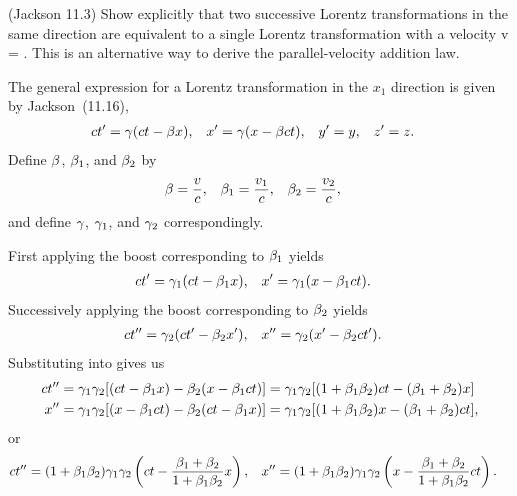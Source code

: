 \newcommand{\vq}{v_1}
\newcommand{\vw}{v_2}

\begin{statement}{(Jackson 11.3)}
	Show explicitly that two successive Lorentz transformations in the same direction are equivalent to a single Lorentz transformation with a velocity
	\beq
		v = \frac{\vq + \vw}{1 + \vq \vw / c^2}.
	\eeq
	This is an alternative way to derive the parallel-velocity addition law.
\end{statement}

\newcommand{\xo}{x_0}
\newcommand{\xq}{x_1}
\newcommand{\xw}{x_2}
\newcommand{\xe}{x_3}

\newcommand{\betq}{\bet_1}
\newcommand{\betw}{\bet_2}
\newcommand{\gamq}{\gam_1}
\newcommand{\gamw}{\gam_2}

\begin{solution}
	The general expression for a Lorentz transformation in the $\xq$ direction is given by Jackson~(11.16),
	\begin{align} \label{lorentz}
		c t' &= \gamma (ct - \beta x), &
		x' &= \gamma (x - \beta c t), &
		y' &= y, &
		z' &= z.
	\end{align}
	Define $\beta$, $\betq$, and $\betw$ by
	\begin{align*}
		\bet &= \frac{v}{c}, &
		\betq &= \frac{\vq}{c}, &
		\betw &= \frac{\vw}{c},
	\end{align*}
	and define $\gamma$, $\gamq$, and $\gamw$ correspondingly.
	
	First applying the boost corresponding to $\betq$ yields
	\begin{align} \label{boost1}
		c t' &= \gamq (c t - \betq x), &
		x' &= \gamq (x - \betq c t).
	\end{align}
	Successively applying the boost corresponding to $\betw$ yields
	\begin{align} \label{boost2}
		c t'' &= \gamw (c t' - \betw x'), &
		x'' &= \gamw (x' - \betw c t').
	\end{align}
	Substituting  into  gives us
	\begin{align*}
		c t'' &= \gamq \gamw [(c t - \betq x) - \betw (x - \betq c t)]
		= \gamq \gamw [(1 + \betq \betw) c t - (\betq + \betw) x] \\
		x'' &= \gamq \gamw [(x - \betq c t) - \betw (c t - \betq x)]
		= \gamq \gamw [(1 + \betq \betw) x - (\betq + \betw) c t],
	\end{align*}
	or
	\begin{align} \label{thing1}
		c t'' &= (1 + \betq \betw) \gamq \gamw \left( c t - \frac{\betq + \betw}{1 + \betq \betw} x \right), &
		x'' &= (1 + \betq \betw) \gamq \gamw \left( x - \frac{\betq + \betw}{1 + \betq \betw} c t \right).
	\end{align}
	

\end{solution}
